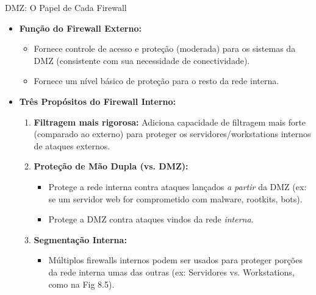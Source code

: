\begin{frame}{DMZ: O Papel de Cada Firewall}
    \begin{itemize}
        \item \textbf{Função do Firewall Externo:}
              \begin{itemize}
                  \item Fornece controle de acesso e proteção (moderada) para os sistemas da DMZ (consistente com sua necessidade de conectividade).
                  \item Fornece um nível básico de proteção para o resto da rede interna.
              \end{itemize}

        \item \textbf{Três Propósitos do Firewall Interno:}
              \begin{enumerate}
                  \item \textbf{Filtragem mais rigorosa:} Adiciona capacidade de filtragem mais forte (comparado ao externo) para proteger os servidores/workstations internos de ataques externos.

                  \item \textbf{Proteção de Mão Dupla (vs. DMZ):}
                        \begin{itemize}
                            \item Protege a rede interna contra ataques lançados \textit{a partir} da DMZ (ex: se um servidor web for comprometido com malware, rootkits, bots).
                            \item Protege a DMZ contra ataques vindos da rede \textit{interna}.
                        \end{itemize}

                  \item \textbf{Segmentação Interna:}
                        \begin{itemize}
                            \item Múltiplos firewalls internos podem ser usados para proteger porções da rede interna umas das outras (ex: Servidores vs. Workstations, como na Fig 8.5).
                        \end{itemize}
              \end{enumerate}
    \end{itemize}
\end{frame}

